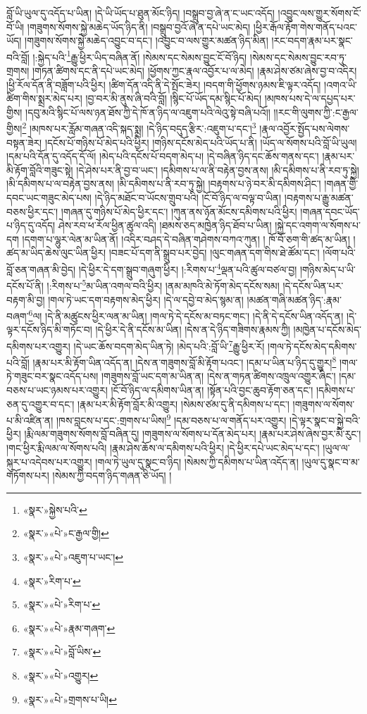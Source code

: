 བློ་ཡི་ཡུལ་དུ་འདོད་པ་ཡིན། །དེ་ཡི་ཡོད་པ་ཐུན་མོང་ཉིད། །བསྒྲུབ་བྱ་ཞེ་ན་ང་ཡང་འདོད། །འབྱུང་ལས་གྱུར་སོགས་ངོ་བོ་ཡི། །གཟུགས་སོགས་སྐྱེ་མཆེད་ཡོད་ཉིད་ནི། །བསྒྲུབ་བྱའོ་ཞེ་ན་དཔེ་ཡང་མེད། །ཕྱིར་རྒོལ་རྟོག་གེས་གནོད་པའང་ཡོད། །གཟུགས་སོགས་སྐྱེ་མཆེད་འབྱུང་བ་དང་། །འབྱུང་བ་ལས་གྱུར་མཚན་ཉིད་མིན། །རང་བདག་རྣམ་པར་སྣང་བའི་བློ། །:སྐྱེད་པའི་\footnote{«སྣར་»སྐྱེས་པའི་}རྒྱུ་ཕྱིར་ཡིད་བཞིན་ནོ། །སེམས་དང་སེམས་བྱུང་ངོ་བོ་ཉིད། །སེམས་དང་སེམས་བྱུང་རབ་ཏུ་གྲགས། །གཏན་ཚིགས་དང་ནི་དཔེ་ཡང་མེད། །ཕྱོགས་ཀྱང་རྣལ་འབྱོར་པ་ལ་མེད། །རྣམ་ཤེས་ཙམ་ཞེས་བྱ་བ་འདིར། །ཕྱི་རོལ་དོན་ནི་བཟློག་པའི་ཕྱིར། །ཚིག་དོན་འདི་ནི་དེ་སྤོང་ཟེར། །བདག་གི་ཕྱོགས་ཉམས་ཇི་ལྟར་འདོད། །འགའ་ཡི་ཚིག་གིས་སྨྲར་མེད་པར། །བྱ་བར་མི་ནུས་ཞི་བའི་བློ། །སྙིང་པོ་ཡོད་དམ་སྙིང་པོ་མེད། །མཁས་པས་དེ་ལ་དཔྱད་པར་གྱིས། །དབུ་མའི་སྙིང་པོ་ལས་ཉན་ཐོས་ཀྱི་དེ་ཁོ་ན་ཉིད་ལ་འཇུག་པའི་ལེའུ་སྟེ་བཞི་པའོ།། །།རང་གི་ལུགས་ཀྱི་:ང་རྒྱལ་གྱིས།\footnote{«སྣར་»«པེ་»ང་རྒྱལ་གྱི།} །མཁས་པར་རློམ་གཞན་འདི་སྐད་སྨྲ། །དེ་ཉིད་བདུད་རྩིར་:འཇུག་པ་དང་།\footnote{«སྣར་»«པེ་»འཇུག་པ་ཡང་།} །རྣལ་འབྱོར་སྤྱོད་པས་ལེགས་བསྟན་ཟེར། །དངོས་པོ་གཉིས་པོ་མེད་པའི་ཕྱིར། །གཉིས་དངོས་མེད་པའི་ཡོད་པ་ནི། །ཡོད་ལ་སོགས་པའི་བློ་ཡི་ཡུལ། །དམ་པའི་དོན་དུ་འདོད་དོ་ལོ། །མེད་པའི་དངོས་པོ་བདག་མེད་པ། །དེ་བཞིན་ཉིད་དང་ཆོས་གནས་དང་། །རྣམ་པར་མི་རྟོག་བློའི་གཟུང་སྟེ། །དེ་ཤེས་པར་ནི་བྱ་བ་ཡང་། །དམིགས་པ་ལ་ནི་བརྟེན་བྱས་ནས། །མི་དམིགས་པ་ནི་རབ་ཏུ་སྐྱེ། །མི་དམིགས་པ་ལ་བརྟེན་བྱས་ནས། །མི་དམིགས་པ་ནི་རབ་ཏུ་སྐྱེ། །བརྟགས་པ་ཉེ་བར་མི་དམིགས་ཤིང་། །གཞན་གྱི་དབང་ཡང་གཟུང་མེད་པས། །དེ་ཉིད་མཐོང་བ་ཡོངས་གྲུབ་པའི། །ངོ་བོ་ཉིད་ལ་བལྟ་བ་ཡིན། །བརྟགས་པ་རྒྱུ་མཚན་བཅས་ཕྱིར་དང་། །གཞན་དུ་གཉིས་པོ་མེད་ཕྱིར་དང་། །ཀུན་ནས་ཉོན་མོངས་དམིགས་པའི་ཕྱིར། །གཞན་དབང་ཡོད་པ་ཉིད་དུ་འདོད། ཤེས་རབ་ཕ་རོལ་ཕྱིན་ཚུལ་འདི། །ཐམས་ཅད་མཁྱེན་ཉིད་ཐོབ་པ་ཡིན། །སྐྱེ་དང་འགག་ལ་སོགས་པ་དག །དགག་པ་ལྷུར་ལེན་མ་ཡིན་ནོ། །འདིར་བཤད་དེ་བཞིན་གཤེགས་བཀའ་ཀུན། །
ཁོ་བོ་ཅག་གི་ཚད་མ་ཡིན། །ཚད་མ་ཡིད་ཆེས་ལུང་ཡིན་ཕྱིར། །བཟང་པོ་དག་ནི་སྒྲུབ་པར་བྱེད། །ལུང་གཞན་དག་གིས་ཐེ་ཚོམ་དང་། །ལོག་པའི་བློ་ཅན་གཞན་མི་བྱེད། །དེ་ཕྱིར་དེ་དག་སྒྲུབ་གཞུག་ཕྱིར། །:རིགས་པ་\footnote{«སྣར་»རིག་པ་}ལྡན་པའི་ཚུལ་བཙལ་བྱ། །གཉིས་མེད་པ་ཡི་དངོས་པོ་ནི། །:རིགས་པ་\footnote{«སྣར་»«པེ་»རིག་པ་}མ་ཡིན་འགལ་བའི་ཕྱིར། །ནམ་མཁའི་མེ་ཏོག་མེད་དངོས་སམ། །དེ་དངོས་ཡིན་པར་བརྟག་མི་བྱ། །གལ་ཏེ་ཡང་དག་བརྟགས་མེད་ཕྱིར། །དེ་ལ་དབྱེ་བ་མེད་སྙམ་ན། །མཚན་གཞི་མཚན་ཉིད་:རྣམ་བཞག་\footnote{«སྣར་»«པེ་»རྣམ་གཞག་}ལ། །དེ་ནི་མཚུངས་ཕྱིར་ལན་མ་ཡིན། །གལ་ཏེ་དེ་དངོས་མ་བཏང་གང་། །དེ་ནི་དེ་དངོས་ཡིན་འདོད་ན། །དེ་ལྟར་དངོས་ཉིད་མི་གཏོང་བ། །དེ་ཕྱིར་དེ་ནི་དངོས་མ་ཡིན། །དེས་ན་དེ་ཉིད་གཟིགས་རྣམས་ཀྱི། །མཁྱེན་པ་དངོས་མེད་དམིགས་པར་འགྱུར། །དེ་ཡང་ཆོས་བདག་མེད་ཡིན་ཏེ། །མེད་པའི་:བློ་ཡི་\footnote{«སྣར་»«པེ་»བློ་ཡིས་}རྒྱུ་ཕྱིར་རོ། །གལ་ཏེ་དངོས་མེད་དམིགས་པའི་བློ། །རྣམ་པར་མི་རྟོག་ཡིན་འདོད་ན། །དེས་ན་གཟུགས་བློ་མི་རྟོག་པའང་། །དམ་པ་ཡིན་པ་ཉིད་དུ་གྱུར།\footnote{«སྣར་»«པེ་»འགྱུར།} །གལ་ཏེ་གཟུང་བར་སྣང་འདོད་པས། །གཟུགས་བློ་ཡང་དག་མ་ཡིན་ན། །དེས་ན་གཏན་ཚིགས་འཁྲུལ་འགྱུར་ཞིང་། །དམ་བཅས་པ་ཡང་ཉམས་པར་འགྱུར། །ངོ་བོ་ཉིད་ལ་དམིགས་ཡིན་ན། །སྟོན་པའི་བྱང་ཆུབ་རྟོག་ཅན་དང་། །དམིགས་པ་ཅན་དུ་འགྱུར་བ་དང་། །རྣམ་པར་མི་རྟོག་བློར་མི་འགྱུར། །སེམས་ཙམ་དུ་ནི་དམིགས་པ་དང་། །གཟུགས་ལ་སོགས་པ་མི་འཛིན་ན། །ཁས་བླངས་པ་དང་:གྲགས་པ་ཡིས།\footnote{«སྣར་»«པེ་»གྲགས་པ་ཡི།} །དམ་བཅས་པ་ལ་གནོད་པར་འགྱུར། །དེ་ལྟར་སྣང་བ་སྐྱེ་བའི་ཕྱིར། །རྨི་ལམ་གཟུགས་སོགས་བློ་བཞིན་དུ། །གཟུགས་ལ་སོགས་པ་དོན་མེད་པར། །རྣམ་པར་ཤེས་ཞེས་བྱར་མི་རུང་། །གང་ཕྱིར་རྨི་ལམ་ལ་སོགས་པའི། །རྣམ་ཤེས་ཆོས་ལ་དམིགས་པའི་ཕྱིར། །དེ་ཕྱིར་དཔེ་ཡང་མེད་པ་དང་། །ཡུལ་ལ་སྐུར་པ་འདེབས་པར་འགྱུར། །གལ་ཏེ་ཡུལ་དུ་སྣང་བ་ཉིད། །སེམས་ཀྱི་དམིགས་པ་ཡིན་འདོད་ན། །ཡུལ་དུ་སྣང་བ་མ་གཏོགས་པར། །སེམས་ཀྱི་བདག་ཉིད་གཞན་ཅི་ཡོད། །
